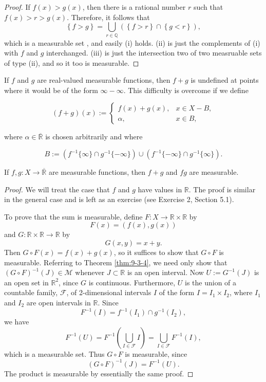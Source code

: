 \documentclass[../main.tex]{subfiles}
\begin{document}
\begin{proof}
    If \(  f\left( x \right)   > g\left( x \right) \), then there is a rational number \(  r  \) such that \(  f\left( x \right)> r> g\left( x \right)    \). Therefore, it follows that \[
    \left\{ f> g \right\}= \bigcup _{r \in \mathbb{Q} }\left( \left\{ f> r \right\} \cap \left\{ g< r \right\}\right), 
    \]which is a measurable set , and easily (i) holds. (ii) is just the complements of (i) with \(  f  \) and \(  g  \) interchanged. (iii) is just the intersection two of two measruable sets of type (ii), and so it too is measurable.     
\end{proof}
\begin{definition}{}{}
    If $f$ and $g$ are real-valued measurable functions, then $f+g$ is undefined at points where it would be of the form $\infty - \infty$. This difficulty is overcome if we define

\[(f+g)(x) := \begin{cases} f(x)+g(x), & x \in X - B, \\ \alpha, & x \in B, \end{cases}\]

where $\alpha \in \overline{\mathbb{R} }$ is chosen arbitrarily and where

\[B := (f^{-1}\{\infty\} \cap g^{-1}\{-\infty\}) \cup (f^{-1}\{-\infty\} \cap g^{-1}\{\infty\}).\]
\end{definition}

\begin{theorem}{}{}
    If \(  f,g  :X\to   \overline{\mathbb{R} } \) are measurable functions, then \(  f+ g  \)  and \(  fg  \) are measurable.  
\end{theorem}
\begin{proof}
We will treat the case that $f$ and $g$ have values in $\mathbb{R}$. The proof is similar in the general case and is left as an exercise (see Exercise 2, Section 5.1).

To prove that the sum is measurable, define $F: X \to \mathbb{R} \times \mathbb{R}$ by
\[
F(x) = (f(x),g(x))
\]
and $G: \mathbb{R} \times \mathbb{R} \to \mathbb{R}$ by
\[
G(x,y) = x + y.
\]
Then $G \circ F(x) = f(x) + g(x)$, so it suffices to show that $G \circ F$ is measurable. Referring to Theorem \ref{thm:9-3-4}, we need only show that $(G \circ F)^{-1}(J) \in \mathcal{M}$ whenever $J \subset \mathbb{R}$ is an open interval. Now $U := G^{-1}(J)$ is an open set in $\mathbb{R}^2$, since $G$ is continuous. Furthermore, $U$ is the union of a countable family, $\mathcal{F}$, of 2-dimensional intervals $I$ of the form $I = I_1 \times I_2$, where $I_1$ and $I_2$ are open intervals in $\mathbb{R}$. Since
\[
F^{-1}(I) = f^{-1}(I_1) \cap g^{-1}(I_2),
\]
we have
\[
F^{-1}(U) = F^{-1}\left(\bigcup_{I \in \mathcal{F}} I\right) = \bigcup_{I \in \mathcal{F}} F^{-1}(I),
\]
which is a measurable set. Thus $G \circ F$ is measurable, since
\[
(G \circ F)^{-1}(J) = F^{-1}(U).
\]
The product is measurable by essentially the same proof.
\end{proof}
\end{document}
